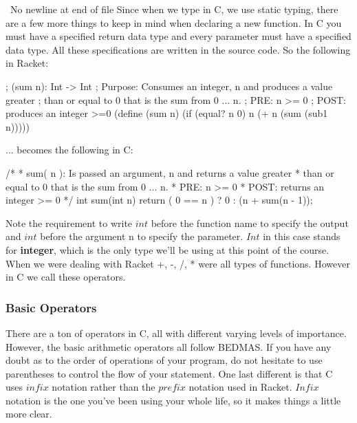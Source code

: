  
\ No newline at end of file
Since when we type in C, we use static typing, there are a few more things to keep in mind when declaring a new function.  In C you must have a specified return data type and every parameter must have a specified data type.  All these specifications are written in the source code.  So the following in Racket: \\

\begin{code}[Lisp]
; (sum n): Int -> Int
;	Purpose: Consumes an integer, n and produces a value greater
;	         than or equal to 0 that is the sum from 0 ... n.
; PRE: n >= 0
; POST: produces an integer >=0
(define (sum n)
	(if (equal? n 0) n (+ n (sum (sub1 n)))))
\end{code}

... becomes the following in C:\\

\begin{code}[C]
/*
 * sum( n ): Is passed an argument, n and returns a value greater
 *           than or equal to 0 that is the sum from 0 ... n.
 * PRE: n >= 0
 * POST: returns an integer >= 0
 */
int sum(int n) 
{
	return ( 0 == n ) ? 0 : (n + sum(n - 1));
}
\end{code}

Note the requirement to write $int$ before the function name to specify the output and $int$ before the argument n to specify the parameter.  $Int$ in this case stands for \textbf{integer}, which is the only type we'll be using at this point of the course.\\

When we were dealing with Racket +, -, /, * were all types of functions.  However in C we call these operators.

\subsubsection*{Basic Operators}

There are a ton of operators in C, all with different varying levels of importance.  However, the basic arithmetic operators all follow BEDMAS.  If you have any doubt as to the order of operations of your program, do not hesitate to use parentheses to control the flow of your statement.  One last different is that C uses $infix$ notation rather than the $prefix$ notation used in Racket.  $Infix$ notation is the one you've been using your whole life, so it makes things a little more clear.\\

